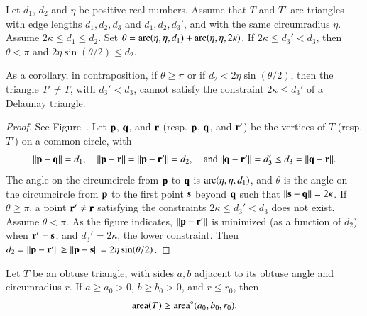 \begin{lemma}  
  Let $d_1$, $d_2$ and $\eta$ be positive real numbers.  Assume that
  $T$ and $T'$ are triangles with edge lengths $d_1,d_2,d_3$ and
  $d_1,d_2,d_3'$, and with the same circumradius $\eta$. Assume
  $2\kappa\le d_1\le d_2$.  Set $\theta =
  \operatorname{arc}(\eta,\eta,d_1)+\operatorname{arc}(\eta,\eta,2\kappa)$.  If $2\kappa \le d_3'
  < d_3$, then $\theta < \pi$ and $2\eta\sin(\theta/2) \le d_2$.
\end{lemma}

As a corollary, 
in contraposition, if $\theta\ge\pi$ or if $d_2 < 2\eta\sin(\theta/2)$,
then the triangle $T'\ne T$, with $d_3' < d_3$,
cannot satisfy the constraint $2\kappa\le d_3'$ of a  Delaunay triangle.

\begin{proof} 
  See Figure~.  Let ${\mathbf p}$, ${\mathbf q}$, and ${\mathbf r}$ (resp. ${\mathbf p}$,
  ${\mathbf q}$, and ${\mathbf r}'$) be the vertices of $T$ (resp. $T'$) on a common
  circle, with
\[
\norm{\p}{\q} =d_1, 
\quad\norm{\p}{\r}=\norm{\p}{\r'}=d_2, \quad\text{and } 
\norm{\q}{\r'} = d_3' \le d_3=\norm{\q}{\r}.
\]
The angle on the circumcircle from ${\mathbf p}$ to ${\mathbf q}$ is
$\operatorname{arc}(\eta,\eta,d_1)$, and $\theta$ is the angle on the circumcircle
from ${\mathbf p}$ to the first point ${\mathbf s}$ beyond ${\mathbf q}$ such that
$\norm{\s}{\q}=2\kappa$.  If $\theta\ge\pi$, a point ${\mathbf r}'\ne {\mathbf r}$
satisfying the constraints $2\kappa\le d_3'<d_3$ does not exist.  Assume $\theta < \pi$.  As
the figure indicates, $\norm{\p}{\r'}$ is minimized (as a function of
$d_2$) when ${\mathbf r}'={\mathbf s}$, and $d_3' = 2\kappa$, the lower constraint.
Then $d_2 = \norm{\p}{\r'}\ge \norm{\p}{\s}= 2\eta\sin(\theta/2)$.
\end{proof}


\begin{lemma}
  Let $T$ be an obtuse triangle, with sides $a,b$ adjacent to its
  obtuse angle and circumradius $r$.  If $a\ge a_0>0$,
  $b\ge b_0>0$, and $r\le r_0$, then
  \[
  {\operatorname{area}}(T)\ge{\operatorname{area}}^\circ(a_0,b_0,r_0).
  \]
\end{lemma}

